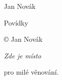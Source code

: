 \documentclass[10pt,a5paper, openany]{book}
\begin{document}
\pagestyle{empty}
\begin{center}
	\vspace*{\fill}
	\Huge\sc
	Jan Novák

	Povídky
	\vspace{1em}
	\vspace{\fill}
\end{center}
\clearpage

\vspace*{\fill}
{ 
	\setlength\parindent{0pt}

	© Jan Novák \the\year
}
\clearpage

\begin{flushright}
	\vspace*{\fill}
	\it
	Zde je místo

	pro milé věnování.
	\vspace{\fill}
\end{flushright}
\cleardoublepage

{
	\renewcommand{\bfseries}{\mdseries}
	\tableofcontents
}
\thispagestyle{empty}
\cleardoublepage

\pagestyle{fancy}

% 
% 
% 

\clearpage
\pagestyle{empty}
\cleardoublepage

% 
\thispagestyle{empty}
\cleardoublepage
\end{document}
